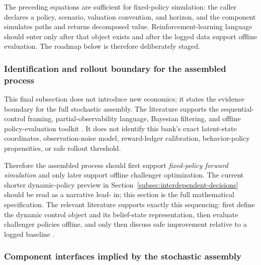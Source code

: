 \documentclass[11pt]{article}
\newcommand{\1}{\mathbf{1}}
\begin{document}
The preceding equations are sufficient for fixed-policy simulation: the caller
declares a policy, scenario, valuation convention, and horizon, and the
component simulates paths and returns decomposed value. Reinforcement-learning
language should enter only after that object exists and after the logged data
support offline evaluation. The roadmap below is therefore deliberately staged.

\subsubsection{Identification and rollout boundary for the assembled process}
\label{subsec:state-space-identification-boundary}

This final subsection does not introduce new economics; it states the evidence
boundary for the full stochastic assembly. The literature supports the
sequential-control framing, partial-observability language, Bayesian filtering,
and offline policy-evaluation toolkit
\citep{puterman1994mdp,murphy2003dynamic,smallwood1973pomdp,kaelbling1998pomdp,
trench2003bankone,durbinkoopman2012ssm,westharrison1997bfdm,doucet2001smc,
jiangli2016dr,huwager2021pomdpope,laroche2019spibb,
khraishiokhrati2022offlinecredit,chehrazi2015dynamicvaluation,
chehrazi2019collections}. It does not identify this bank's exact latent-state
coordinates, observation-noise model, reward-ledger calibration,
behavior-policy propensities, or safe rollout threshold.

Therefore the assembled process should first support
\emph{fixed-policy forward simulation} and only later support offline challenger
optimization. The current shorter dynamic-policy preview in
Section~\ref{subsec:interdependent-decisions} should be read as a narrative lead-
in; this section is the full mathematical specification. The relevant literature
supports exactly this sequencing: first define the dynamic control object and
its belief-state representation, then evaluate challenger policies offline, and
only then discuss safe improvement relative to a logged baseline
\citep{puterman1994mdp,murphy2003dynamic,jiangli2016dr,
huwager2021pomdpope,laroche2019spibb,khraishiokhrati2022offlinecredit}.

\subsubsection{Component interfaces implied by the stochastic assembly}
\label{subsec:state-space-component-interfaces}
\end{document}
